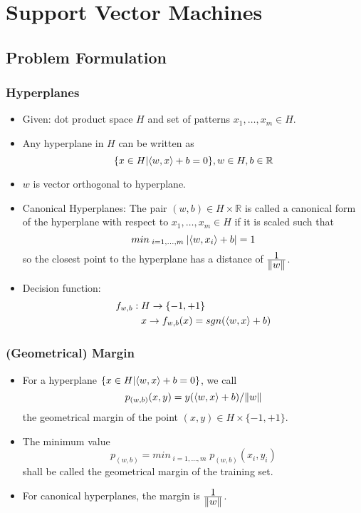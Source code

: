 \documentclass{scrartcl}
\newcommand{\ffrac}[2]{\ensuremath{\frac{\displaystyle #1}{\displaystyle #2}}}
\DeclarePairedDelimiter\abs{\lvert}{\rvert}%
\DeclarePairedDelimiter\norm{\lVert}{\rVert}%
\DeclarePairedDelimiter\inner{\langle}{\rangle}%
\begin{document}
\section{Support Vector Machines}
\subsection{Problem Formulation}
\subsubsection{Hyperplanes}
\begin{itemize}
    \item
        Given: dot product space $H$ and set of patterns $x_{1}, \dots, x_{m} \in H$.
    \item
        Any hyperplane in $H$ can be written as 
        $$\{x \in H | \inner{w, x} + b = 0\}, w \in H, b \in \mathbb{R}$$
    \item
        $w$ is vector orthogonal to hyperplane.
    \item
        Canonical Hyperplanes: 
        The pair $(w,b) \in H \times \mathbb{R}$ is called a canonical form of the hyperplane with respect to $x_{1}, \dots, x_{m} \in H$ if it is scaled such that
        $$ min_{\; i=1, \dots, m \;} \abs{\inner{w, x_{i}} + b} = 1$$
        so the closest point to the hyperplane has a distance of \ffrac{1}{\norm{w}}.
    \item
        Decision function:
        \begin{align*}
        f_{w,b}: \; & H \rightarrow \{-1, +1\}\\
            & x \rightarrow f_{w,b}(x) = sgn(\inner{w,x}+b)
        \end{align*}
\end{itemize}

\subsubsection{(Geometrical) Margin}
\begin{itemize}
    \item
        For a hyperplane $\{x \in H | \inner{w,x} +b = 0\}$, we call
        $$ p_{(w, b)}(x,y) = y(\inner{w,x}+b)/\norm{w}$$
        the geometrical margin of the point $(x,y) \in H \times \{-1, +1\}$.

    \item
        The minimum value
        $$ p_{(w, b)} = min_{\;i=1,\dots,m} \;p_{(w, b)}(x_{i},y_{i})$$
        shall be called the geometrical margin of the training set.
    \item
        For canonical hyperplanes, the margin is $\ffrac{1}{\norm{w}}$.
\end{itemize}
\end{document}
